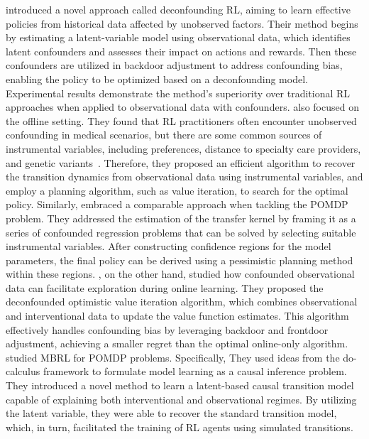 \documentclass[10pt]{article} %
\theoremstyle{definition}
\begin{document}
\citet{luDeconfoundingReinforcementLearning2018a} introduced a novel approach called deconfounding RL, aiming to learn effective policies from historical data affected by unobserved factors. Their method begins by estimating a latent-variable model using observational data, which identifies latent confounders and assesses their impact on actions and rewards. Then these confounders are utilized in backdoor adjustment to address confounding bias, enabling the policy to be optimized based on a deconfounding model. Experimental results demonstrate the method's superiority over traditional RL approaches when applied to observational data with confounders. \citet{liaoInstrumentalVariableValue2021a} also focused on the offline setting. They found that RL practitioners often encounter unobserved confounding in medical scenarios, but there are some common sources of instrumental variables, including preferences, distance to specialty care providers, and genetic variants~\citep{baiocchiInstrumentalVariableMethods2014}. Therefore, they proposed an efficient algorithm to recover the transition dynamics from observational data using instrumental variables, and employ a planning algorithm, such as value iteration, to search for the optimal policy.
Similarly, \citet{guoProvablyEfficientOffline2022} embraced a comparable approach when tackling the POMDP problem. They addressed the estimation of the transfer kernel by framing it as a series of confounded regression problems that can be solved by selecting suitable instrumental variables. After constructing confidence regions for the model parameters, the final policy can be derived using a pessimistic planning method within these regions.
\citet{wangProvablyEfficientCausal2021a}, on the other hand, studied how confounded observational data can facilitate exploration during online learning. They proposed the deconfounded optimistic value iteration algorithm, which combines observational and interventional data to update the value function estimates.  This algorithm effectively handles confounding bias by leveraging backdoor and frontdoor adjustment, achieving a smaller regret than the optimal online-only algorithm. 
\citet{gasseUsingConfoundedData2023} studied MBRL for POMDP problems. Specifically, They used ideas from the do-calculus framework to formulate model learning as a causal inference problem. They introduced a novel method to learn a latent-based causal transition model capable of explaining both interventional and observational regimes.  By utilizing the latent variable, they were able to recover the standard transition model, which, in turn, facilitated the training of RL agents using simulated transitions.
\end{document}

